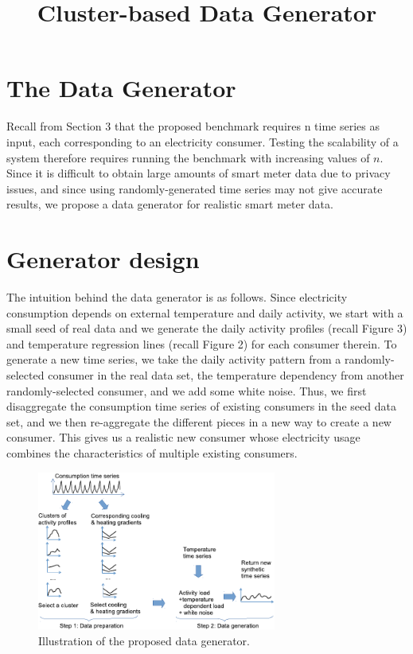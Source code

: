 \documentclass[a4paper,12pt]{llncs}
\begin{document}
\title{Cluster-based Data Generator}


\maketitle

\begin{abstract}
\end{abstract}


\section{The Data Generator}
Recall from Section 3 that the proposed benchmark requires n time series as input,
each corresponding to an electricity consumer. Testing the scalability of a system therefore requires running the benchmark with increasing values of $n$. Since it is difficult to obtain large amounts of smart meter data due to privacy issues, and since using randomly-generated time series may not give accurate results, we propose a data generator for realistic smart meter data. 


\section{Generator design}
The intuition behind the data generator is as follows. Since electricity consumption depends on external temperature and daily activity, we start with a small seed of real data and we generate the daily activity profiles (recall Figure 3) and temperature regression lines (recall Figure 2) for each consumer therein. To generate a new time series, we take the daily activity pattern from a randomly-selected consumer in the
real data set, the temperature dependency from another randomly-selected consumer, and we add some white noise. Thus, we first disaggregate the consumption time series of existing consumers in the seed data set, and we then re-aggregate the different pieces in a new way to create a new consumer. This gives us a realistic new consumer whose electricity usage combines the characteristics of multiple existing consumers.


\begin{figure}[htp]
\centering
\includegraphics[width=0.7\textwidth]{images/datagenoverview}
\caption{Illustration of the proposed data generator.}
\label{fig:datagenoverview}
\end{figure}
\end{document}
